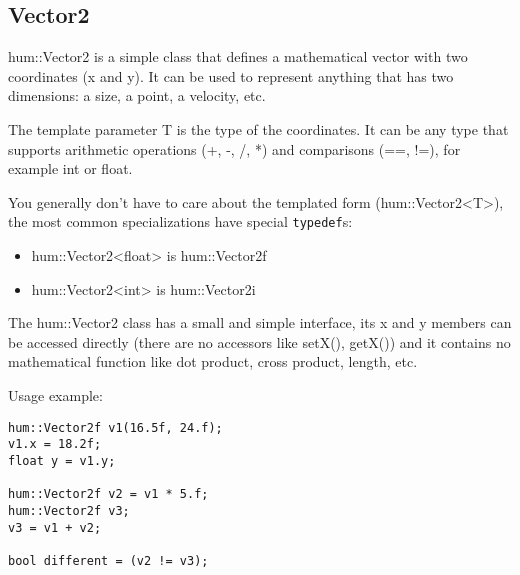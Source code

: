 \subsection{Vector2}
hum::Vector2 is a simple class that defines a mathematical
vector with two coordinates (x and y). It can be used to
represent anything that has two dimensions: a size, a point,
a velocity, etc.

The template parameter T is the type of the coordinates. It
can be any type that supports arithmetic operations (+, -, /, *)
and comparisons (==, !=), for example int or float.

You generally don't have to care about the templated form (hum::Vector2<T>),
the most common specializations have special \texttt{typedef}s:
\begin{itemize}
\item hum::Vector2<float> is hum::Vector2f
\item hum::Vector2<int> is hum::Vector2i
\end{itemize}

The hum::Vector2 class has a small and simple interface, its x and y members
can be accessed directly (there are no accessors like setX(), getX()) and it
contains no mathematical function like dot product, cross product, length, etc.

Usage example:
\begin{lstlisting}[caption=Vec2 example]
hum::Vector2f v1(16.5f, 24.f);
v1.x = 18.2f;
float y = v1.y;

hum::Vector2f v2 = v1 * 5.f;
hum::Vector2f v3;
v3 = v1 + v2;

bool different = (v2 != v3);
\end{lstlisting}
